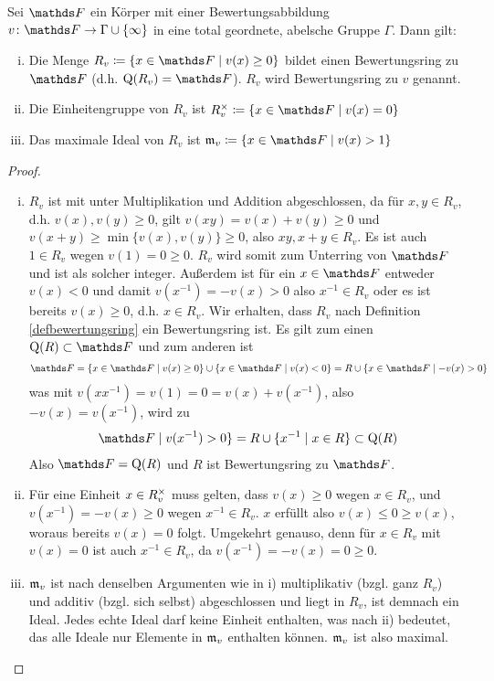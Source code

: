 \documentclass[ngerman,fontsize=11pt, paper=a4, parskip=half, titlepage=true, toc=bib]{scrartcl}
\begin{document}
\begin{Satz}\label{bewertungsringausbewertung}
  Sei $\F$ ein Körper mit einer Bewertungsabbildung
  $v\colon\F\to\Gamma\cup\{\infty\}$ in eine total geordnete, abelsche Gruppe
  $\Gamma$. Dann gilt:
  \begin{enumerate}[i)]
  \item   Die Menge $R_v\coloneqq\left\{x\in \F\mid  v(x)\geq 0\right\}$ bildet
    einen Bewertungsring zu $\F$ (d.h. $\Quot(R_v)=\F$).
    $R_v$ wird Bewertungsring zu $v$ genannt.
  \item Die Einheitengruppe von $R_v$ ist 
    $\Rx_v\coloneqq\left\{x\in\F\mid v(x)=0\right\}$
  \item Das maximale Ideal von $R_v$ ist
    $\frakm_v\coloneqq\left\{x\in\F\mid v(x)>1\right\}$
  \end{enumerate}

  \begin{proof}
    \begin{enumerate}[i)]
    \item $R_v$ ist mit unter Multiplikation und Addition abgeschlossen, da für
      $x,y\in R_v$, d.h. $v(x),v(y)\geq 0$, 
      gilt $v(xy)=v(x)+v(y)\geq 0$ und 
      $v(x+y)\geq \min\{v(x),v(y)\}\geq 0$, also $xy, x+y\in R_v$.
      Es ist auch $1\in R_v$ wegen $v(1)=0\geq 0$.
      $R_v$ wird somit  zum Unterring von $\F$ und ist als solcher integer.
      Außerdem ist für ein $x\in \F$ entweder $v(x)<0$
      und damit $v(x^{-1})=-v(x)>0$ also $x^{-1}\in R_v$ oder es ist
      bereits $v(x)\geq 0$, d.h. $x\in R_v$.
      Wir erhalten, dass $R_v$ nach Definition \ref{defbewertungsring}
      ein Bewertungsring ist.
      Es gilt zum einen $\Quot(R)\subset\F$ und zum anderen ist
      \begin{gather*}
        \F=\{x\in\F\mid v(x)\geq 0\}\cup\{x\in\F\mid v(x)<0\}
        =R\cup\{x\in\F\mid -v(x)>0\}
      \end{gather*}
      was mit
      $v(xx^{-1})=v(1)=0=v(x)+v(x^{-1})$, also $-v(x)=v(x^{-1})$,
      wird zu 
      \begin{gather*}
        \F\mid v(x^{-1})>0\}=R\cup\{x^{-1}\mid x\in R\}\subset \Quot(R)
      \end{gather*}
      Also $\F=\Quot(R)$ und $R$ ist
      Bewertungsring zu $\F$.
    \item Für eine Einheit $x\in R^\times_v$ muss gelten, dass $v(x)\geq 0$
      wegen $x\in R_v$, und  $v(x^{-1})=-v(x)\geq 0$ wegen $x^{-1}\in R_v$. 
      $x$ erfüllt also $v(x)\leq 0 \geq v(x)$, woraus bereits $v(x)=0$
      folgt.
      Umgekehrt genauso, denn für $x\in R_v$ mit $v(x)=0$ ist auch
      $x^{-1}\in R_v$, da $v(x^{-1})=-v(x)=0\geq 0$.
    \item $\mathfrak{m}_v$ ist nach denselben Argumenten wie in i)
      multiplikativ (bzgl. ganz $R_v$) und additiv (bzgl. sich selbst)
      abgeschlossen und liegt in $R_v$, ist demnach ein Ideal.
      Jedes echte Ideal darf keine Einheit enthalten, was nach ii) bedeutet,
      das alle Ideale nur Elemente in $\mathfrak{m}_v$ enthalten
      können. $\mathfrak{m}_v$ ist also maximal.
    \end{enumerate}
  \end{proof}
\end{Satz}
\end{document}
